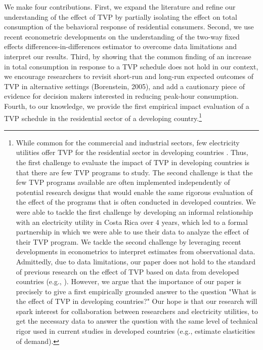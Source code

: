 \documentclass[12pt]{article}
\begin{document}
We make four contributions. First, we expand the literature and refine our understanding of the effect of TVP by partially isolating the effect on total consumption of the behavioral response of residential consumers. Second, we use recent econometric developments on the understanding of the two-way fixed effects differences-in-differences estimator to overcome data limitations and interpret our results. Third, by showing that the common finding of an increase in total consumption in response to a TVP schedule does not hold in our context, we encourage researchers to revisit short-run and long-run expected outcomes of TVP in alternative settings (Borenstein, 2005), and add a cautionary piece of evidence for decision makers interested in reducing peak-hour consumption. Fourth, to our knowledge, we provide the first empirical impact evaluation of a TVP schedule in the residential sector of a developing country.\footnote{While common for the commercial and industrial sectors, few electricity utilities offer TVP for the residential sector in developing countries \citep{duttaLiteratureReviewDynamic2017}. Thus, the first challenge to evaluate the impact of TVP in developing countries is that there are few TVP programs to study. The second challenge is that the few TVP programs available are often implemented independently of potential research designs that would enable the same rigorous evaluation of the effect of the programs that is often conducted in developed countries. We were able to tackle the first challenge by developing an informal relationship with an electricity utility in Costa Rica over 4 years, which led to a formal partnership in which we were able to use their data to analyze the effect of their TVP program. We tackle the second challenge by leveraging recent developments in econometrics to interpret estimates from observational data. Admittedly, due to data limitations, our paper does not hold to the standard of previous research on the effect of TVP based on data from developed countries (e.g., \cite{allcottRethinkingRealtimeElectricity2011}). However, we argue that the importance of our paper is precisely to give a first empirically grounded answer to the question "What is the effect of TVP in developing countries?" Our hope is that our research will spark interest for collaboration between researchers and electricity utilities, to get the necessary data to answer the question with the same level of technical rigor used in current studies in developed countries (e.g., estimate elasticities of demand).}
\end{document}
